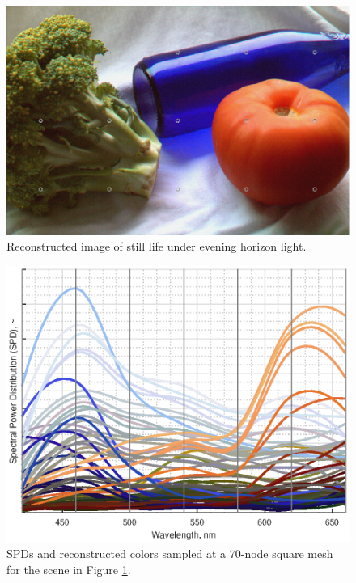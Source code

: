 \documentclass[twocolumn,10pt]{asme2ej}
\begin{document}
\begin{figure}[H]
\begin{centering}
  \includegraphics[height=0.55\linewidth]{broccoli_bottle_tomato.png}
  \caption{Reconstructed image of still life under evening horizon light.}
  \label{tomato_mesh}
  \end{centering}
\end{figure}

\begin{figure}[H]
\begin{centering}
  \includegraphics[height=0.6\linewidth]{broccoli_bottle_tomato.eps}
  \caption{SPDs and reconstructed colors sampled at a 70-node square mesh for the scene in Figure \ref{tomato_mesh}.}
  \label{tomato_SPDs}
  \end{centering}
\end{figure}

\clearpage
\end{document}
